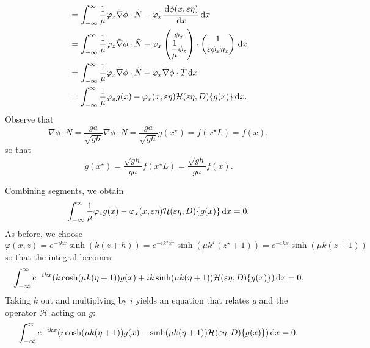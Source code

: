 \documentclass[10pt,reqno,oneside,a4paper]{article}
\begin{document}
\begin{itemize}
\begin{align*}
&= \int_{-\infty}^{\infty} \frac{1}{\mu} \varphi_z \tilde{\nabla} \phi \cdot \tilde{N} -\varphi_x \frac{\,\mathrm{d} \phi(x, \varepsilon \eta)}{\,\mathrm{d} x} \,\mathrm{d} x \\
&= \int_{-\infty}^{\infty} \frac{1}{\mu} \varphi_z \tilde{\nabla} \phi \cdot \tilde{N} -\varphi_x \begin{pmatrix} \phi_x  \\ \dfrac{1}{\mu}\phi_z \end{pmatrix} \cdot \begin{pmatrix} 1 \\ \varepsilon \phi_x \eta_x \end{pmatrix} \,\mathrm{d} x \\
&= \int_{-\infty}^{\infty} \frac{1}{\mu} \varphi_z \tilde{\nabla} \phi \cdot \tilde{N} -\varphi_x \tilde{\nabla} \phi \cdot \tilde{T} \,\mathrm{d} x \\
&= \int_{-\infty}^{\infty} \frac{1}{\mu} \varphi_z g(x) -\varphi_x(x, \varepsilon \eta) \mathcal{H}(\varepsilon \eta, D)\{ g(x) \} \,\mathrm{d} x.
\end{align*}
Observe that 
\[ \nabla \phi \cdot N = \frac{ga}{\sqrt{gh}} \tilde{\nabla} \phi \cdot \tilde{N} = \frac{ga}{\sqrt{gh}} g(x^{\star}) = f(x^{\star} L) = f(x), \]
so that 
\[ 
g(x^{\star}) = \frac{\sqrt{gh}}{ga}f(x^{\star}L) = \frac{\sqrt{gh}}{ga}f(x).
\]
\end{itemize}
Combining segments, we obtain 
\begin{align*}
\int_{-\infty}^{\infty} \frac{1}{\mu}\varphi_z g(x) -\varphi_x(x, \varepsilon\eta) \mathcal{H}( \varepsilon\eta, D)\{ g(x) \} \,\mathrm{d} x = 0.
\end{align*}
As before, we choose $\varphi(x,z) = e^{-ikx} \sinh(k(z+h)) = e^{-ik^{\star}x^{\star}} \sinh(\mu k^{\star}(z^{\star}+1)) = e^{-ikx} \sinh(\mu k(z+1))$ so that the integral becomes:
\begin{align*}
\int_{-\infty}^{\infty} e^{-ikx}( k \cosh(\mu k(\eta+1)) g(x) + ik \sinh(\mu k(\eta+1)) \mathcal{H}( \varepsilon \eta, D)\{ g(x) \}) \,\mathrm{d} x = 0.
\end{align*}
Taking $k$ out and multiplying by $i$ yields an equation that relates $g$ and the operator $\mathcal{H}$ acting on $g:$
\begin{equation}\label{NDimHbehav}
\int_{-\infty}^{\infty} e^{-ikx}( i  \cosh(\mu k(\eta+1)) g(x) - \sinh(\mu k(\eta+1)) \mathcal{H}( \varepsilon \eta, D)\{ g(x) \}) \,\mathrm{d} x = 0.
\end{equation}
\end{document}
